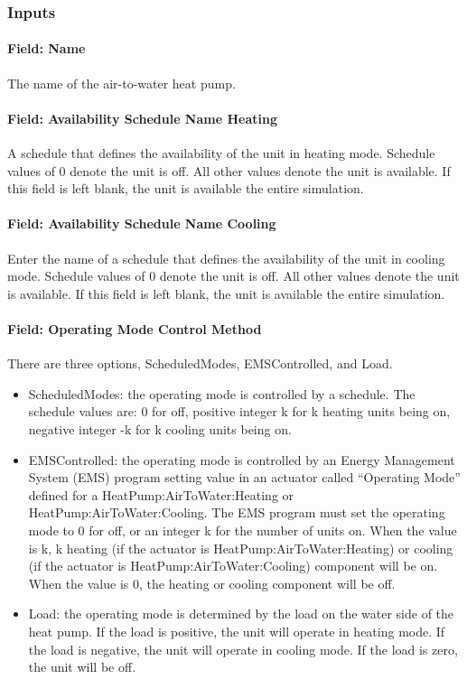 \subsubsection{Inputs}
\paragraph{Field: Name} The name of the air-to-water heat pump.

\paragraph{Field: Availability Schedule Name Heating} A schedule that defines the
availability of the unit in heating mode. Schedule values of 0 denote the unit
is off. All other values denote the unit is available. If this field is left
blank, the unit is available the entire simulation.
\paragraph{Field: Availability Schedule Name Cooling} Enter the name of a
schedule that defines the availability of the unit in cooling mode. Schedule
values of 0 denote the unit is off. All other values denote the unit is
available. If this field is left blank, the unit is available the entire
simulation.
\paragraph{Field: Operating Mode Control Method} There are three options,
ScheduledModes, EMSControlled, and Load.
\begin{itemize}
\item ScheduledModes: the operating mode is controlled by a schedule. The
schedule values are: 0 for off, positive integer k for k heating units being on,
negative integer -k for k cooling units being on.
\item EMSControlled: the operating mode is controlled by an Energy Management
System (EMS) program setting value in an actuator called ``Operating Mode''
defined for a HeatPump:AirToWater:Heating or HeatPump:AirToWater:Cooling. The
EMS program must set the operating mode to 0 for off, or an integer k for the
number of units on. When the value is k, k heating (if the actuator is HeatPump:AirToWater:Heating)
or cooling (if the actuator is HeatPump:AirToWater:Cooling) component will be on.
When the value is 0, the heating or cooling component will be off.
\item Load: the operating mode is determined by the load on the water side of
the heat pump. If the load is positive, the unit will operate in heating mode.
If the load is negative, the unit will operate in cooling mode. If the load is
zero, the unit will be off.
\end{itemize}
